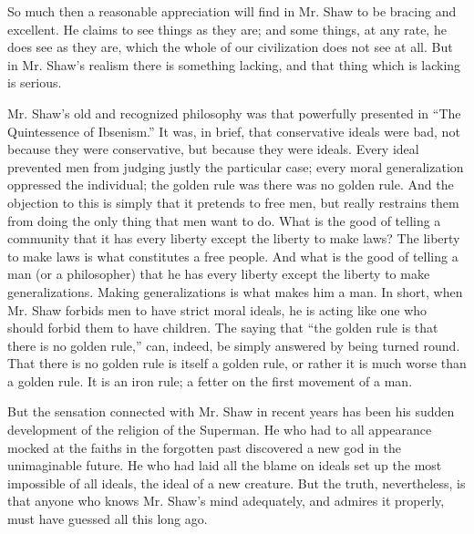 So much then a reasonable appreciation will find in Mr. Shaw to be bracing and excellent. He claims to see things as they are; and some things, at any rate, he does see as they are, which the whole of our civilization does not see at all. But in Mr. Shaw’s realism there is something lacking, and that thing which is lacking is serious.

Mr. Shaw’s old and recognized philosophy was that powerfully presented in “The Quintessence of Ibsenism.” It was, in brief, that conservative ideals were bad, not because they were conservative, but because they were ideals. Every ideal prevented men from judging justly the particular case; every moral generalization oppressed the individual; the golden rule was there was no golden rule. And the objection to this is simply that it pretends to free men, but really restrains them from doing the only thing that men want to do. What is the good of telling a community that it has every liberty except the liberty to make laws? The liberty to make laws is what constitutes a free people. And what is the good of telling a man (or a philosopher) that he has every liberty except the liberty to make generalizations. Making generalizations is what makes him a man. In short, when Mr. Shaw forbids men to have strict moral ideals, he is acting like one who should forbid them to have children. The saying that “the golden rule is that there is no golden rule,” can, indeed, be simply answered by being turned round. That there is no golden rule is itself a golden rule, or rather it is much worse than a golden rule. It is an iron rule; a fetter on the first movement of a man.

But the sensation connected with Mr. Shaw in recent years has been his sudden development of the religion of the Superman. He who had to all appearance mocked at the faiths in the forgotten past discovered a new god in the unimaginable future. He who had laid all the blame on ideals set up the most impossible of all ideals, the ideal of a new creature. But the truth, nevertheless, is that anyone who knows Mr. Shaw’s mind adequately, and admires it properly, must have guessed all this long ago.

